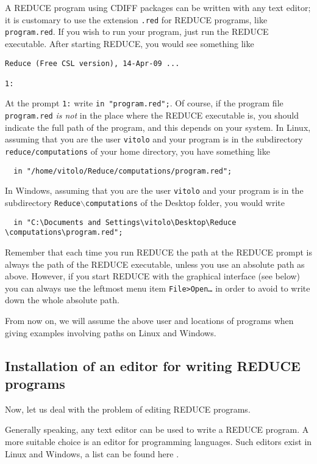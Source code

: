 \documentclass[12pt]{amsart}
\theoremstyle{definition}
\newcommand{\cdiff}{CDIFF\xspace}
\newcommand{\reduce}{REDUCE\xspace}
\begin{document}
A \reduce program using \cdiff packages can be written with any text editor; it
is customary to use the extension \texttt{.red} for \reduce programs, like
\texttt{program.red}. If you wish to run your program, just run the \reduce
executable. After starting \reduce, you would see something like
\begin{verbatim}
Reduce (Free CSL version), 14-Apr-09 ...

1:
\end{verbatim}
At the prompt \texttt{1:} write \texttt{in "program.red";}. Of course, if the
program file \texttt{program.red} \emph{is not} in the place where the \reduce
executable is, you should indicate the full path of the program, and this
depends on your system. In Linux, assuming that you are the user
\texttt{vitolo} and your program is in the subdirectory
\texttt{reduce/computations} of your home directory, you have something like
\begin{verbatim}
  in "/home/vitolo/Reduce/computations/program.red";
\end{verbatim}
In Windows, assuming that you are the user
\texttt{vitolo} and your program is in the subdirectory
\texttt{Reduce$\backslash$computations} of the Desktop folder, you would write
\begin{verbatim}
  in "C:\Documents and Settings\vitolo\Desktop\Reduce
\computations\program.red";
\end{verbatim}
Remember that each time you run \reduce the path at the \reduce prompt is always
the path of the \reduce executable, unless you use an absolute path as
above. However, if you start \reduce with the graphical interface (see below)
you can always use the leftmost menu item \texttt{File>Open\dots} in order to
avoid to write down the whole absolute path.

From now on, we will assume the above user and locations of programs when
giving examples involving paths on Linux and Windows.

\subsection{Installation of an editor for writing \reduce programs}
\label{sec:inst-reduce-ide}

Now, let us deal with the problem of editing \reduce programs.

Generally speaking, any text editor can be used to write a \reduce program. A
more suitable choice is an editor for programming languages. Such editors exist
in Linux and Windows, a list can be found here \cite{ed}.
\end{document}
